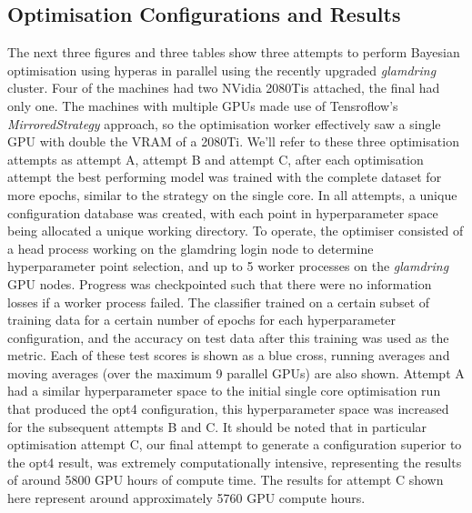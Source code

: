 \subsection{Optimisation Configurations and Results}
The next three figures and three tables show three attempts to perform Bayesian optimisation using hyperas in parallel using the recently upgraded \textit{glamdring} cluster. Four of the machines had two NVidia 2080Tis attached, the final had only one. The machines with multiple GPUs made use of Tensroflow's \textit{MirroredStrategy} approach, so the optimisation worker effectively saw a single GPU with double the VRAM of a 2080Ti. We'll refer to these three optimisation attempts as attempt A, attempt B and attempt C, after each optimisation attempt the best performing model was trained with the complete dataset for more epochs, similar to the strategy on the single core. In all attempts, a unique configuration database was created, with each point in hyperparameter space being allocated a unique working directory. To operate, the optimiser consisted of a head process working on the glamdring login node to determine hyperparameter point selection, and up to 5 worker processes on the \textit{glamdring} GPU nodes. Progress was checkpointed such that there were no information losses if a worker process failed. The classifier trained on a certain subset of training data for a certain number of epochs for each hyperparameter configuration, and the accuracy on test data after this training was used as the metric. Each of these test scores is shown as a blue cross, running averages and moving averages (over the maximum 9 parallel GPUs) are also shown. Attempt A had a similar hyperparameter space to the initial single core optimisation run that produced the opt4 configuration, this hyperparameter space was increased for the subsequent attempts B and C. It should be noted that in particular optimisation attempt C, our final attempt to generate a configuration superior to the opt4 result, was extremely computationally intensive, representing the results of around 5800 GPU hours of compute time. The results for attempt C shown here represent around approximately 5760 GPU compute hours.

